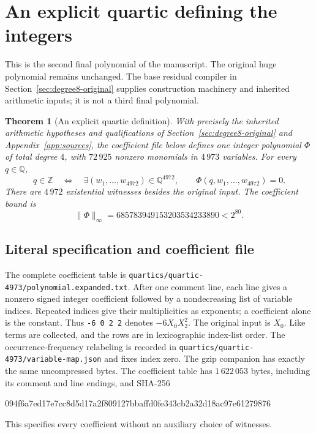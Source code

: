 \documentclass[11pt]{article}
\newtheorem{theorem}{Theorem}[section]
\theoremstyle{definition}
\theoremstyle{remark}
\newcommand{\Q}{\mathbb Q}
\newcommand{\Z}{\mathbb Z}
\begin{document}
\section{An explicit quartic defining the integers}
\label{sec:quartics}
This is the second final polynomial of the manuscript. The original huge
polynomial remains unchanged. The base residual compiler in
Section~\ref{sec:degree8-original} supplies construction machinery and
inherited arithmetic inputs; it is not a third final polynomial.

\begin{theorem}[An explicit quartic definition]\label{thm:quartic}
With precisely the inherited arithmetic hypotheses and qualifications of
Section~\ref{sec:degree8-original} and Appendix~\ref{app:sources}, the
coefficient file below defines one integer polynomial $\Phi$ of total
degree $4$, with $72\,925$ nonzero monomials in $4\,973$ variables.
For every $q\in\Q$,
\[
 q\in\Z\quad\Longleftrightarrow\quad
 \exists(w_1,\ldots,w_{4972})\in\Q^{4972},\qquad
 \Phi(q,w_1,\ldots,w_{4972})=0.
\]
There are $4\,972$ existential witnesses besides the original input.
The coefficient bound is
\[
 \|\Phi\|_\infty=685783949153203534233890<2^{80}.
\]
\end{theorem}

\subsection{Literal specification and coefficient file}
The complete coefficient table is \nolinkurl{quartics/quartic-4973/polynomial.expanded.txt}.
After one comment line, each line gives a nonzero signed integer coefficient
followed by a nondecreasing list of variable indices. Repeated indices give
their multiplicities as exponents; a coefficient alone is the constant.
Thus \texttt{-6 0 2 2} denotes $-6X_0X_2^2$. The original input is $X_0$.
Like terms are collected, and the rows are in lexicographic index-list order.
The occurrence-frequency relabeling is recorded in
\nolinkurl{quartics/quartic-4973/variable-map.json} and fixes index zero.
The gzip companion has exactly the same uncompressed bytes.
The coefficient table has $1\,622\,053$ bytes, including
its comment and line endings, and SHA-256
\begin{center}\footnotesize\ttfamily
094f6a7ed17e7cc8d5d17a2f809127bbaffd0fe343cb2a32d18ac97e61279876
\end{center}

This specifies every coefficient without an auxiliary choice of witnesses.
\end{document}
